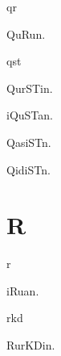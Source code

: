 \begin{multicols*}{2}
\begin{dictroot}{q}{r}
    \begin{dictentry}{QuRu}{n.}
    \end{dictentry}
\end{dictroot}

\begin{dictroot}{q}{st}
    \begin{dictentry}{QurSTi}{n.}
    \end{dictentry}
    \begin{dictentry}{iQuSTa}{n.}
    \end{dictentry}
    \begin{dictentry}{QasiST}{n.}
    \end{dictentry}
    \begin{dictentry}{QidiST}{n.}
    \end{dictentry}
\end{dictroot}

\section*{R}

\begin{dictroot}{r}{\bigglot}
    \begin{dictentry}{iRu{\bigglot}a}{n.}
    \end{dictentry}
\end{dictroot}

\begin{dictroot}{r}{kd}
    \begin{dictentry}{RurKDi}{n.}
    \end{dictentry}
\end{dictroot}


\end{multicols*}
